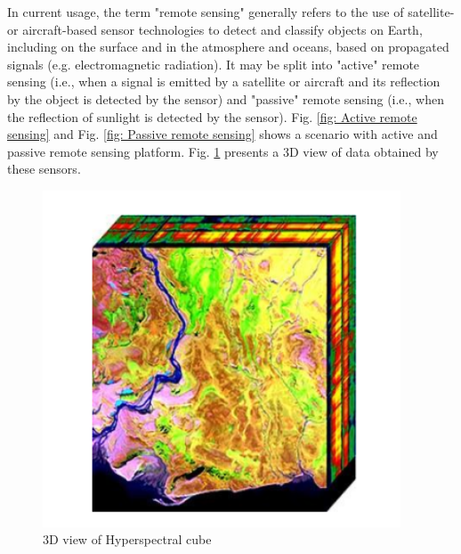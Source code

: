 \documentclass[document.tex]{subfiles}
\begin{document}
\noindent In current usage, the term "remote sensing" generally refers to the use of satellite- or aircraft-based sensor technologies to detect and classify objects on Earth, including on the surface and in the atmosphere and oceans, based on propagated signals (e.g. electromagnetic radiation). It may be split into "active" remote sensing (i.e., when a signal is emitted by a satellite or aircraft and its reflection by the object is detected by the sensor) and "passive" remote sensing (i.e., when the reflection of sunlight is detected by the sensor). Fig. \ref{fig: Active remote sensing} and Fig. \ref{fig: Passive remote sensing} shows a scenario with active and passive remote sensing platform. Fig. \ref{fig: Hyperspectral cube} presents a 3D view of data obtained by these sensors.
\begin{figure}[H]
	\begin{center}
		\includegraphics[height=10.0cm]{imgs/cube.png}
	\end{center}
	\caption{3D view
		of Hyperspectral cube\cite{31}}
	\label{fig: Hyperspectral cube}
\end{figure}
\end{document}
